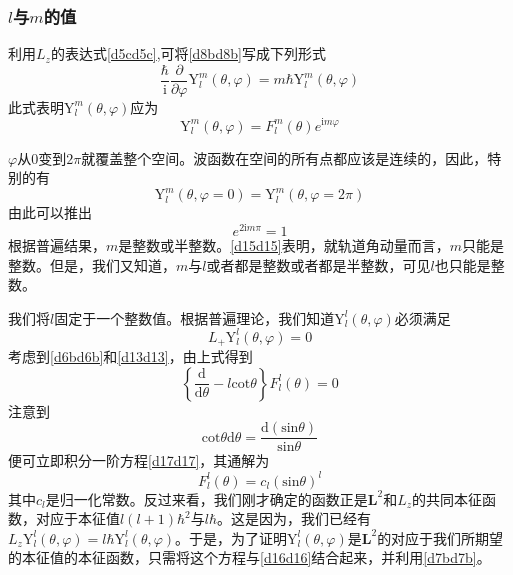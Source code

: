 \documentclass[]{article}
\begin{document}
\subsubsection{$l$与$m$的值}
利用$L_z$的表达式\eqref{d5cd5c},可将\eqref{d8bd8b}写成下列形式
\begin{equation}
	\dfrac{\hbar}{\mathrm{i}}\dfrac{\partial}{\partial\varphi}\mathrm{Y}_l^m(\theta,\varphi)=m\hbar \mathrm{Y}_l^m(\theta,\varphi)
\end{equation}
此式表明$\mathrm{Y}_l^m(\theta,\varphi)$应为
\begin{equation}
	\mathrm{Y}_l^m(\theta,\varphi)=F_l^m(\theta)e^{\mathrm{i}m\varphi}
	\label{d13d13}
\end{equation}

$\varphi$从0变到$2\pi$就覆盖整个空间。波函数在空间的所有点都应该是连续的，因此，特别的有
\begin{equation}
	\mathrm{Y}_l^m(\theta,\varphi=0)=\mathrm{Y}_l^m(\theta,\varphi=2\pi)
\end{equation}
由此可以推出
\begin{equation}
	e^{2\mathrm{i}m\pi}=1
	\label{d15d15}
\end{equation}
根据普遍结果，$m$是整数或半整数。\eqref{d15d15}表明，就轨道角动量而言，$m$只能是整数。但是，我们又知道，$m$与$l$或者都是整数或者都是半整数，可见$l$也只能是整数。\par 
我们将$l$固定于一个整数值。根据普遍理论，我们知道$\mathrm{Y}_l^l(\theta,\varphi)$必须满足
\begin{equation}
	L_+\mathrm{Y}_l^l(\theta,\varphi)=0
	\label{d16d16}
\end{equation}
考虑到\eqref{d6bd6b}和\eqref{d13d13}，由上式得到
\begin{equation}
	\left\lbrace \dfrac{\mathrm{d}}{\mathrm{d}\theta}-l\mathrm{cot}\theta\right\rbrace F_l^l(\theta)=0
	\label{d17d17}
\end{equation}
注意到
\begin{equation}
	\mathrm{cot}\theta\mathrm{d}\theta=\dfrac{\mathrm{d}(\mathrm{sin}\theta)}{\mathrm{sin}\theta}
\end{equation}
便可立即积分一阶方程\eqref{d17d17}，其通解为
\begin{equation}
	F^l_l(\theta)=c_l(\mathrm{sin}\theta)^l
\end{equation}
其中$c_l$是归一化常数。反过来看，我们刚才确定的函数正是$\boldsymbol{L}^2$和$L_z$的共同本征函数，对应于本征值$l(l+1)\hbar^2$与$l\hbar$。这是因为，我们已经有$L_z\mathrm{Y}_l^l(\theta,\varphi)=l\hbar \mathrm{Y}_l^l(\theta,\varphi)$。于是，为了证明$\mathrm{Y}_l^l(\theta,\varphi)$是$\boldsymbol{L}^2$的对应于我们所期望的本征值的本征函数，只需将这个方程与\eqref{d16d16}结合起来，并利用\eqref{d7bd7b}。\par 
\end{document}

